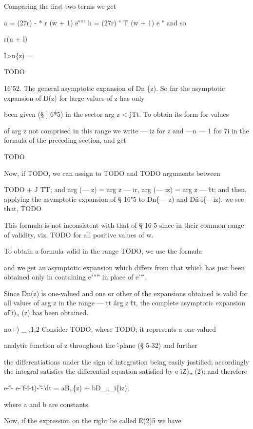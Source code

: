 Comparing the first two terms we get

a = (27r) - * r (w + 1) e\^'''' h = (27r) " \^ T (w + 1) e " and so

r(n + l)

I>n\{z) =

TODO

16'52. The general asymptotic expansion of Dn \{z). So far the
asymptotic expansion of D\^ (z) for large values of z has only

been given (§ ] 6*5) in the sector arg z < jTt. To obtain its form for
values

of arg z not comprised in this range we write — iz for z and —n — 1
for 7i in the formula of the preceding section, and get

TODO

Now, if TODO, we can assign to TODO and TODO arguments between

TODO + J TT; and arg (— z) = arg z — ir, arg (— iz) = arg z — \^tt;
and then, applying the asymptotic expansion of § 16"5 to Dn\{— z) and
D\^n-i\{—iz), we see that, TODO

%
%

This formula is not inconsistent with that of § 16-5 since in their
common range of validity, viz. TODO for all positive values of w.

To obtain a formula valid in the range TODO, we use the formula

and we get an asymptotic expansion which differs from that which has
just been obtained only in containing e""'\^' in place of e'"\^'.

Since Dn(z) is one-valued and one or other of the expansions obtained
is valid for all values of arg z in the range — tt \^ arg z \^tt, the
complete asymptotic expansion of i)„ (z) has been obtained.


no+) \_ ,1,2 Consider TODO, where TODO; it represents a one-valued

analytic function of z throughout the \^-plane (§ 5-32) and further

the differentiations under the sign of integration being easily
justified; accordingly the integral satisfies the differential
equation satisfied by e \~ i\^ Z)„ (2); and therefore

e-\^'- e-'f-\^i-t)-'\^-'dt = aB„\{z) + bD\_„\_i\{iz),

where a and b are constants.

Now, if the expression on the right be called E\^ (2)5 we have

